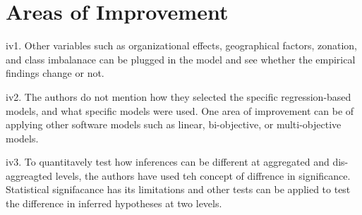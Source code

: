 \documentclass[12pt]{article}
\begin{document}
\section{Areas of Improvement}
\label{improvement}


\begin{itemize}
\begin{item}
iv1. Other variables such as organizational effects, geographical factors, zonation, and class imbalanace
can be plugged in the model and see whether the empirical findings change or not. 
\end{item}
\begin{item}
iv2. The authors do not mention how they selected the specific regression-based models, and what specific models were used. One area of improvement can be of applying other software models 
such as linear, bi-objective, or multi-objective models. 
\end{item}
\begin{item}
iv3. To quantitavely test how inferences can be different at aggregated 
and dis-aggreagted levels, the authors have used teh concept of 
diffrence in significance. Statistical signifacance has its limitations
and other tests can be applied to test the difference in inferred hypotheses
at two levels. 
\end{item}

\end{itemize} 









\end{document}
